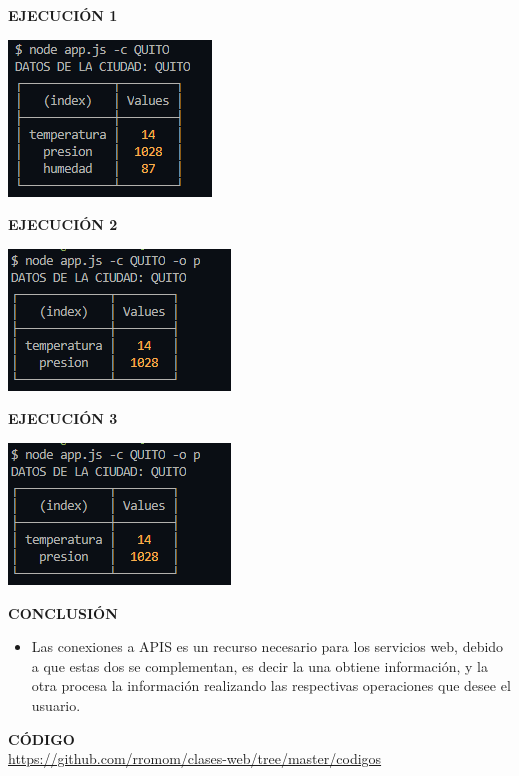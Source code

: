 \documentclass{report}
\begin{document}
   \textbf{EJECUCIÓN 1}
   \begin{center}
       \includegraphics[scale=0.9]{ej1.PNG}
     \end{center}
   \textbf{EJECUCIÓN 2}
   \begin{center}
       \includegraphics[scale=0.9]{ej2.PNG}
     \end{center}
     \textbf{EJECUCIÓN 3}
     \begin{center}
       \includegraphics[scale=0.9]{ej3.PNG}
     \end{center}
   \textbf{CONCLUSIÓN}
   \begin{itemize}
       \item Las conexiones a APIS es un recurso necesario para los servicios web, debido a que estas dos se complementan, es decir la una obtiene información, y la otra procesa la información realizando las respectivas operaciones que desee el usuario.
   \end{itemize}
   
   \textbf{CÓDIGO}
   \\
   \url{https://github.com/rromom/clases-web/tree/master/codigos}
\end{document}

